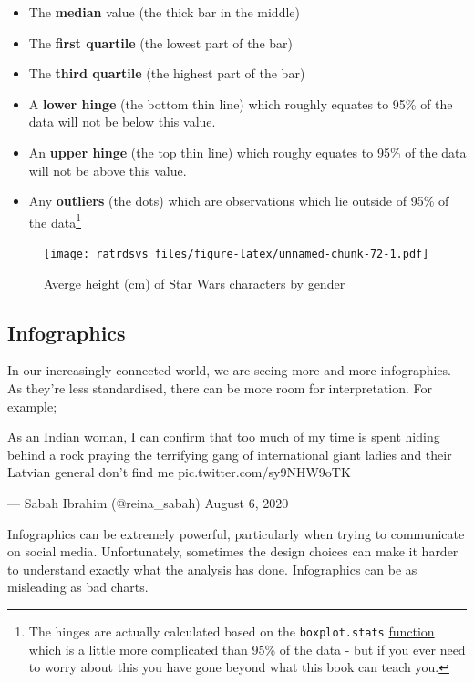 \documentclass[
]{book}
\begin{document}
\begin{itemize}
\item
  The \textbf{median} value (the thick bar in the middle)
\item
  The \textbf{first quartile} (the lowest part of the bar)
\item
  The \textbf{third quartile} (the highest part of the bar)
\item
  A \textbf{lower hinge} (the bottom thin line) which roughly equates to 95\% of the data will not be below this value.
\item
  An \textbf{upper hinge} (the top thin line) which roughy equates to 95\% of the data will not be above this value.
\item
  Any \textbf{outliers} (the dots) which are observations which lie outside of 95\% of the data\footnote{The hinges are actually calculated based on the \texttt{boxplot.stats} \href{https://www.rdocumentation.org/packages/grDevices/versions/3.6.2/topics/boxplot.stats}{function} which is a little more complicated than 95\% of the data - but if you ever need to worry about this you have gone beyond what this book can teach you.}
\end{itemize}

\begin{figure}
\centering
\texttt{[image: ratrdsvs\_files/figure-latex/unnamed-chunk-72-1.pdf]}
\caption{\label{fig:unnamed-chunk-72}Averge height (cm) of Star Wars characters by gender}
\end{figure}

\hypertarget{vis_infographic}{%
\subsection{Infographics}\label{vis_infographic}}

In our increasingly connected world, we are seeing more and more infographics. As they're less standardised, there can be more room for interpretation. For example;

As an Indian woman, I can confirm that too much of my time is spent hiding behind a rock praying the terrifying gang of international giant ladies and their Latvian general don't find me pic.twitter.com/sy9NHW9oTK

--- Sabah Ibrahim (@reina\_sabah) August 6, 2020

Infographics can be extremely powerful, particularly when trying to communicate on social media. Unfortunately, sometimes the design choices can make it harder to understand exactly what the analysis has done. Infographics can be as misleading as bad charts.
\end{document}
